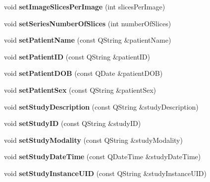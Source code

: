 \begin{DoxyCompactItemize}
void {\bfseries set\+Image\+Slices\+Per\+Image} (int slices\+Per\+Image)
\item 
\mbox{\label{class_series_info_ac6040514bc12b33a27508e393a47ad15}} 
void {\bfseries set\+Series\+Number\+Of\+Slices} (int number\+Of\+Slices)
\item 
\mbox{\label{class_series_info_ab47d111e20b8f0cc53a55518930efd6f}} 
void {\bfseries set\+Patient\+Name} (const Q\+String \&patient\+Name)
\item 
\mbox{\label{class_series_info_a489836b82b5ed54f307fd850369c3939}} 
void {\bfseries set\+Patient\+ID} (const Q\+String \&patient\+ID)
\item 
\mbox{\label{class_series_info_aeae3148f709f152b9705f7e4524e8506}} 
void {\bfseries set\+Patient\+D\+OB} (const Q\+Date \&patient\+D\+OB)
\item 
\mbox{\label{class_series_info_a5f3e8081e83919e79577942b6b03033b}} 
void {\bfseries set\+Patient\+Sex} (const Q\+String \&patient\+Sex)
\item 
\mbox{\label{class_series_info_ada0323bceb521e6bce25fe2d9db76493}} 
void {\bfseries set\+Study\+Description} (const Q\+String \&study\+Description)
\item 
\mbox{\label{class_series_info_ab9581aedaafd907979bf3f4f8f3a4eec}} 
void {\bfseries set\+Study\+ID} (const Q\+String \&study\+ID)
\item 
\mbox{\label{class_series_info_a4c6efd5f4a4c884389ce27e88c375591}} 
void {\bfseries set\+Study\+Modality} (const Q\+String \&study\+Modality)
\item 
\mbox{\label{class_series_info_a89b29213e8130a7804f51dcb5763aeec}} 
void {\bfseries set\+Study\+Date\+Time} (const Q\+Date\+Time \&study\+Date\+Time)
\item 
\mbox{\label{class_series_info_a161916424ebbbc0525f07b06be33ab15}} 
void {\bfseries set\+Study\+Instance\+U\+ID} (const Q\+String \&study\+Instance\+U\+ID)

\end{DoxyCompactItemize}
